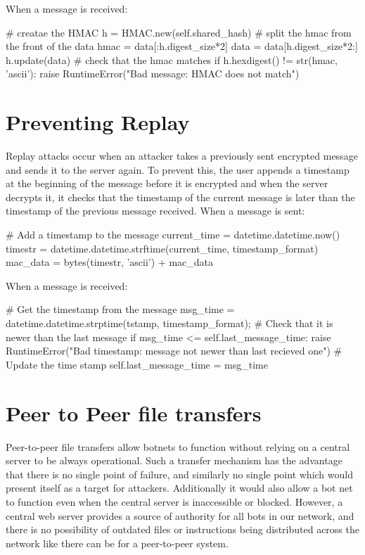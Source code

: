 \documentclass[9pt,a4paper]{article}
\begin{document}
When a message is received:
\begin{center}
\vspace{-2ex}
\begin{python}
# creatae the HMAC
h = HMAC.new(self.shared_hash)
# split the hmac from the front of the data
hmac = data[:h.digest_size*2]
data = data[h.digest_size*2:]
h.update(data)
# check that the hmac matches
if h.hexdigest() != str(hmac, 'ascii'):
    raise RuntimeError("Bad message: HMAC does not match")
\end{python}\end{center}

\section{Preventing Replay}
\vspace{-2ex}
Replay attacks occur when an attacker takes a previously sent encrypted message and sends it to the server again. To prevent this, the user appends a timestamp at the beginning of the message before it is encrypted and when the server decrypts it, it checks that the timestamp of the current message is later than the timestamp of the previous message received.
When a message is sent:
\begin{center}
\vspace{-2ex}
\begin{python}
# Add a timestamp to the message
current_time = datetime.datetime.now()
timestr = datetime.datetime.strftime(current_time, timestamp_format)
mac_data = bytes(timestr, 'ascii') + mac_data
\end{python}\end{center}

When a message is received:
\begin{center}
\vspace{-2ex}
\begin{python}
# Get the timestamp from the message
msg_time = datetime.datetime.strptime(tstamp, timestamp_format);
# Check that it is newer than the last message
if msg_time <= self.last_message_time:
    raise RuntimeError("Bad timestamp: message not newer than last recieved one")
# Update the time stamp
self.last_message_time = msg_time
\end{python}\end{center}

\section{Peer to Peer file transfers}
\vspace{-2ex}
Peer-to-peer file transfers allow botnets to function without relying on a central server to be always operational. Such a transfer mechanism has the advantage that there is no single point of failure, and similarly no single point which would present itself as a target for attackers. Additionally it would also allow a bot net to function even when the central server is inaccessible or blocked. However, a central web server provides a source of authority for all bots in our network, and there is no possibility of outdated files or instructions being distributed across the network like there can be for a peer-to-peer system.
\end{document}
